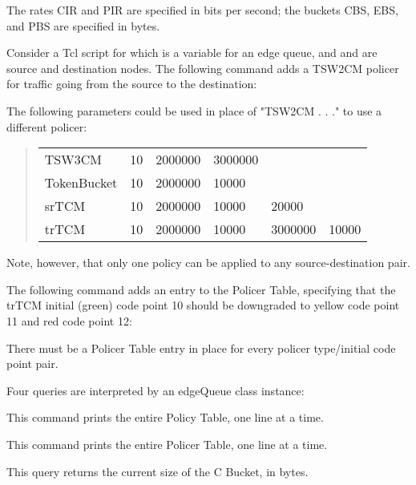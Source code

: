 The rates CIR and PIR are specified in bits per second; the buckets CBS, EBS, and PBS are specified in bytes.
 
Consider a Tcl script for which  is a variable for an edge queue, 
and  and  are source and destination nodes.   
The following command adds a TSW2CM policer for traffic going from the source to the destination:


The following parameters could be used in place of "TSW2CM . . ." to use a different policer:
\begin{quote}
\begin{tabular}{llllll}
TSW3CM&10&2000000&3000000\\
TokenBucket&10&2000000&10000\\
srTCM&10&2000000&10000&20000\\
trTCM&10&2000000&10000&3000000&10000
\end{tabular}
\end{quote}

Note, however, that only one policy can be applied to any source-destination pair.

The following command adds an entry to the Policer Table, specifying that the trTCM initial (green) code point 10 should be downgraded to yellow code point 11 and red code point 12:


There must be a Policer Table entry in place for every policer type/initial code point pair.

Four queries are interpreted by an edgeQueue class instance:


This command prints the entire Policy Table, one line at a time.


This command prints the entire Policer Table, one line at a time.


This query returns the current size of the C Bucket, in bytes.



